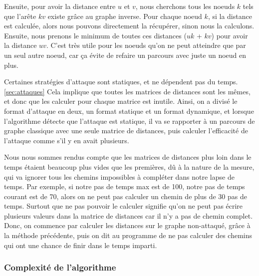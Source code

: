 Ensuite, pour avoir la distance entre $u$ et $v$, nous cherchons tous les noeuds $k$ tels que l'arête $k$\linkright$v$ existe grâce au graphe inverse.
Pour chaque noeud $k$, si la distance est calculée, alors nous pouvons directement la récupérer, sinon nous la calculons.
Ensuite, nous prenons le minimum de toutes ces distances ($u$\linkright$k$ + $k$\linkright$v$) pour avoir la distance $u$\linkright$v$.
C'est très utile pour les noeuds qu'on ne peut atteindre que par un seul autre noeud, car ça évite de refaire un parcours avec juste un noeud en plus.

Certaines stratégies d'attaque sont statiques, et ne dépendent pas du temps.\ref{sec:attaques}
Cela implique que toutes les matrices de distances sont les mêmes, et donc que les calculer pour chaque matrice est inutile.
Ainsi, on a divisé le format d'attaque en deux, un format statique et un format dynamique, 
et lorsque l'algorithme détecte que l'attaque est statique, il va se rapporter à un parcours de graphe classique avec une seule matrice de distances, 
puis calculer l'efficacité de l'attaque comme s'il y en avait plusieurs.

Nous nous sommes rendus compte que les matrices de distances plus loin dans le temps étaient beaucoup plus vides que les premières,
dû à la nature de la mesure, qui va ignorer tous les chemins impossibles à compléter dans notre lapse de temps.
Par exemple, si notre pas de temps max est de 100, notre pas de temps courant est de 70, alors on ne peut pas calculer un chemin de plus de 30 pas de temps.
Surtout que ne pas pouvoir le calculer signifie qu'on ne peut pas écrire plusieurs valeurs dans la matrice de distances car il n'y a pas de chemin complet.
Donc, on commence par calculer les distances sur le graphe non-attaqué, grâce à la méthode précédente, puis on dit au programme de ne pas calculer des chemins qui ont une chance de finir dans le temps imparti.

\subsubsection{Complexité de l'algorithme}

